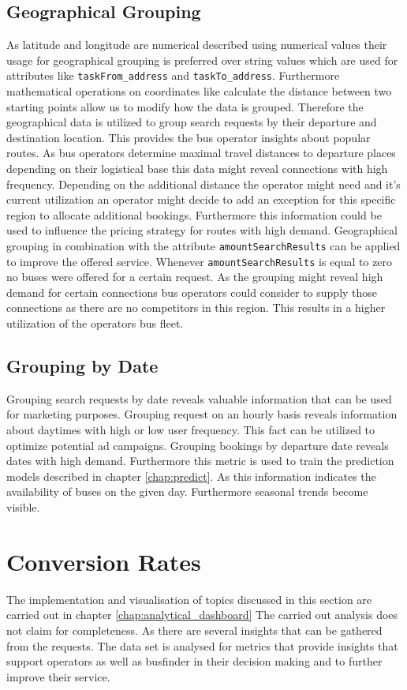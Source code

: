 \subsection{Geographical Grouping}
As latitude and longitude are numerical described using numerical values their usage for geographical grouping is preferred over string values which are used for attributes like \verb|taskFrom_address| and \verb|taskTo_address|. Furthermore mathematical operations on coordinates like calculate the distance between two starting points allow us to modify how the data is grouped. Therefore the geographical data is utilized to group search requests by their departure and destination location. This provides the bus operator insights about popular routes. As bus operators determine maximal travel distances to departure places depending on their logistical base this data might reveal connections with high frequency. Depending on the additional distance the operator might need and it's current utilization an operator might decide to add an exception for this specific region to allocate additional bookings. Furthermore this information could be used to influence the pricing strategy for routes with high demand.
Geographical grouping in combination with the attribute \verb|amountSearchResults| can be applied to improve the offered service. Whenever \verb|amountSearchResults| is equal to zero no buses were offered for a certain request. As the grouping might reveal high demand for certain connections bus operators could consider to supply those connections as there are no competitors in this region. This results in a higher utilization of the operators bus fleet. 
\subsection{Grouping by Date}
Grouping search requests by date reveals valuable information that can be used for marketing purposes. Grouping request on an hourly basis reveals information about daytimes with high or low user frequency. This fact can be utilized to optimize potential ad campaigns. Grouping bookings by departure date reveals dates with high demand. Furthermore this metric is used to train the prediction models described in chapter \ref{chap:predict}. As this information indicates the availability of buses on the given day. Furthermore seasonal trends become visible.\newline

\section{Conversion Rates}




The implementation and visualisation of topics discussed in this section are carried out in chapter \ref{chap:analytical_dashboard}
\newline 
The carried out analysis does not claim for completeness. As there are several insights that can be gathered from the requests. The data set is analysed for metrics that provide insights that support operators as well as busfinder in their decision making and to further improve their service. 